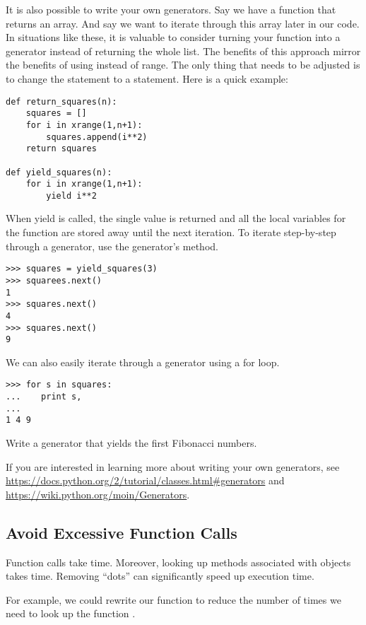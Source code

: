 It is also possible to write your own generators.
Say we have a function that returns an array. And say we want to iterate through this array later in our code. In situations like these, it is valuable to consider turning your function into a generator instead of returning the whole list. The benefits of this approach mirror the benefits of using  instead of {range}. The only thing that needs to be adjusted is to change the  statement to a  statement. Here is a quick example:
\begin{lstlisting}
def return_squares(n):
    squares = []
    for i in xrange(1,n+1):
        squares.append(i**2)
    return squares

def yield_squares(n):
    for i in xrange(1,n+1):
        yield i**2
\end{lstlisting}
When yield is called, the single value is returned and all the local variables for the function are stored away until the next iteration. To iterate step-by-step through a generator, use the generator's  method.
\begin{lstlisting}
>>> squares = yield_squares(3)
>>> squarees.next()
1
>>> squares.next()
4
>>> squares.next()
9
\end{lstlisting}

We can also easily iterate through a generator using a for loop.
\begin{lstlisting}
>>> for s in squares:
...    print s,
...
1 4 9
\end{lstlisting}

\begin{problem}
Write a generator that yields the first  Fibonacci numbers.
\end{problem}

If you are interested in learning more about writing your own generators, see \url{https://docs.python.org/2/tutorial/classes.html#generators} and \url{https://wiki.python.org/moin/Generators}.

\subsection*{Avoid Excessive Function Calls}
Function calls take time.
Moreover, looking up methods associated with objects takes time.
Removing ``dots'' can significantly speed up execution time.

For example, we could rewrite our function to reduce the number of times we need to look up the function .

